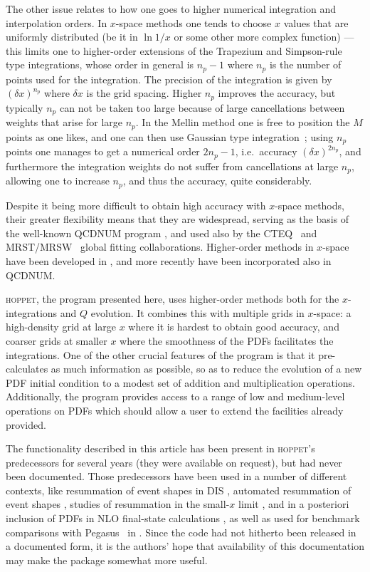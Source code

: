 \documentclass[12pt]{article}
\newcommand{\lp}{\left(}
\newcommand{\rp}{\right)}
\newcommand{\ie}{i.e.\ }
\newcommand{\hoppet}{\textsc{hoppet}\xspace}
\begin{document}
The other issue relates to how one goes to higher numerical
integration and interpolation orders.
In $x$-space methods one tends to choose $x$ values that are uniformly
distributed (be it in $\ln 1/x$ or some other more complex function)
--- this limits one to higher-order extensions of the Trapezium and
Simpson-rule type integrations, whose order in general is $n_p-1$
where $n_p$ is the number of points used for the integration. The
precision of the integration is given by $\lp\delta x\rp^{n_p}$ where
$\delta x$ is the grid spacing. Higher $n_p$ improves the accuracy,
but typically $n_p$ can not be taken too large because of large
cancellations between weights that arise for large $n_p$.
%
%
In the Mellin method one is free to position the $M$ points as one
likes, and one can then use Gaussian type
integration~\cite{Weinzierl:2002mv,Pegasus,Kosower:1997hg}; using $n_p$
points one manages to get a numerical order $2n_p-1$, \ie accuracy
$\lp \delta x\rp^{2n_p}$, and furthermore the integration weights do not suffer
from cancellations at large $n_p$, allowing one to increase
$n_p$, and thus the accuracy, quite considerably.

Despite it being more difficult to obtain high accuracy with $x$-space
methods, their greater flexibility means that they are widespread,
serving as the basis of the well-known  QCDNUM program \cite{Botje},
and  used also by the CTEQ~\cite{CTEQ} and MRST/MRSW~\cite{MRST}
global fitting
collaborations. Higher-order methods in $x$-space have been developed
in \cite{Schoeffel:1998tz,Pascaud:2001bi,coriano,GuzziThesis,DisResum}, and
more recently have been incorporated also in QCDNUM.

\hoppet, the program presented here, uses higher-order methods both for
the $x$-integrations and $Q$ evolution. It combines this with multiple
grids in $x$-space: a high-density grid at large $x$ where it is
hardest to obtain good accuracy, and coarser grids at smaller $x$
where the smoothness of the PDFs facilitates the integrations. One of
the other crucial features of the program is that it pre-calculates as
much information as possible, so as to reduce the 
evolution of a new PDF initial condition to a modest set of addition
and multiplication operations. Additionally, the program provides
access to a range of low and medium-level operations on PDFs which
should allow a user to extend the facilities already provided.


The functionality described in this article has been present in
\hoppet's predecessors for several years (they were available on
request), but had
never been documented. 
Those predecessors have  been used in a number of different
contexts, like resummation of event shapes
in DIS \cite{DisResum}, automated resummation
of event shapes \cite{caesar}, studies of
resummation in the small-$x$ limit \cite{Ciafaloni:2003rd}, 
and in a posteriori inclusion
of PDFs in NLO final-state calculations \cite{APPL,Banfi:2007gu}, as well
as  used for benchmark
comparisons with Pegasus~\cite{Pegasus} in \cite{Benchmarks}.
Since the code had
not hitherto been released in a documented form, 
it is the authors' hope that availability of
this documentation may make the package somewhat more useful.
\end{document}
